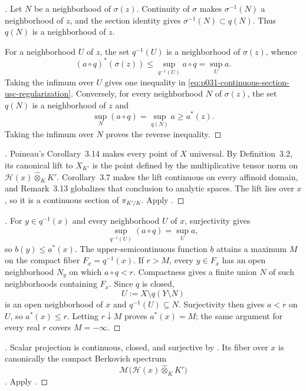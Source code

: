 
\begin{proof}[]
Let $N$ be a neighborhood of $\sigma(z)$.  Continuity of $\sigma$ makes
$\sigma^{-1}(N)$ a neighborhood of $z$, and the section identity gives
$\sigma^{-1}(N)\subset q(N)$.  Thus $q(N)$ is a neighborhood of $z$.

For a neighborhood $U$ of $z$, the set $q^{-1}(U)$ is a neighborhood of
$\sigma(z)$, whence
\[
 (a\circ q)^*(\sigma(z))
   \leq \sup_{q^{-1}(U)}a\circ q
   =\sup_U a.
\]
Taking the infimum over $U$ gives one inequality in
\eqref{eq:p031-continuous-section-usc-regularization}.  Conversely, for
every neighborhood $N$ of $\sigma(z)$, the set $q(N)$ is a neighborhood of
$z$ and
\[
                  \sup_N(a\circ q)=\sup_{q(N)}a\geq a^*(z).
\]
Taking the infimum over $N$ proves the reverse inequality.
\end{proof}

\begin{proof}[]
Poineau's Corollary~3.14 makes every point of $X$ universal.  By
Definition~3.2, its canonical lift to $X_{K'}$ is the point defined by the
multiplicative tensor norm on
$\mathcal H(x)\widehat\otimes_KK'$.  Corollary~3.7 makes the lift continuous
on every affinoid domain, and Remark~3.13 globalizes that conclusion to
analytic spaces.  The lift lies over $x$, so it is a continuous section of
$\pi_{K'/K}$.  Apply
.
\end{proof}

\begin{proof}[]
For $y\in q^{-1}(x)$ and every neighborhood $U$ of $x$, surjectivity gives
\[
 \sup_{q^{-1}(U)}(a\circ q)=\sup_Ua,
\]
so $b(y)\leq a^*(x)$.  The upper-semicontinuous function $b$ attains a
maximum $M$ on the compact fiber $F_x=q^{-1}(x)$.  If $r>M$, every
$y\in F_x$ has an open neighborhood $N_y$ on which $a\circ q<r$.
Compactness gives a finite union $N$ of such neighborhoods containing
$F_x$.  Since $q$ is closed,
\[
                         U:=X\setminus q(Y\setminus N)
\]
is an open neighborhood of $x$ and $q^{-1}(U)\subseteq N$.  Surjectivity
then gives $a<r$ on $U$, so $a^*(x)\leq r$.  Letting $r\downarrow M$
proves $a^*(x)=M$; the same argument for every real $r$ covers
$M=-\infty$.
\end{proof}

\begin{proof}[]
Scalar projection is continuous, closed, and surjective by
\cite[\S2.9]{GR25Classical}.  Its fiber over $x$ is canonically the compact
Berkovich spectrum
\[
       \mathcal M\bigl(\mathcal H(x)\widehat\otimes_KK'\bigr)
\]
\cite[Theorem~1.2.1]{Berk12}.  Apply
.
\end{proof}
